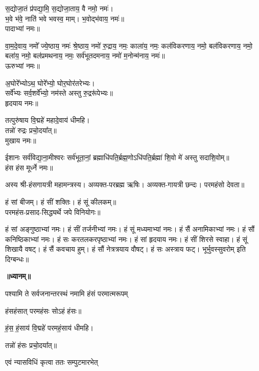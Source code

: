 स॒द्योजा॒तं प्र॑पद्या॒मि॒ स॒द्योजा॒ताय॒ वै नमो॒ नमः॑।\\
भ॒वे भ॑वे॒ नाति॑ भवे भवस्व॒ माम्। भ॒वोद्भ॑वाय॒ नमः॑॥\\
पादाभ्यां नमः॥

वा॒म॒दे॒वाय॒ नमो᳚ ज्ये॒ष्ठाय॒ नमः॑ श्रे॒ष्ठाय॒ नमो॑ रु॒द्राय॒ नमः॒ काला॑य॒ नमः॒ कल॑विकरणाय॒ नमो॒ बल॑विकरणाय॒ नमो॒ बला॑य॒ नमो॒ बल॑प्रमथनाय॒ नमः॒ सर्व॑भूतदमनाय॒ नमो॑ म॒नोन्म॑नाय॒ नमः॑॥\\
ऊरुभ्यां नमः॥ 

अ॒घोरे᳚भ्योऽथ॒ घोरे᳚भ्यो॒ घोर॒घोर॑तरेभ्यः।\\
सर्वे᳚भ्यः सर्व॒शर्वे᳚भ्यो॒ नम॑स्ते अस्तु रु॒द्ररू॑पेभ्यः॥\\
हृदयाय नमः॥ 

तत्पुरु॑षाय वि॒द्महे॑ महादे॒वाय॑ धीमहि।\\
तन्नो॑ रुद्रः प्रचो॒दया᳚त्॥\\
मुखाय नमः॥ 

ईशानः सर्व॑विद्या॒ना॒मीश्वरः सर्व॑भूता॒नां॒ ब्रह्माधि॑पति॒र्ब्रह्म॒णो\-ऽधि॑पति॒र्ब्रह्मा॑ शि॒वो मे॑ अस्तु सदाशि॒वोम्॥\\
हंस हंस मूर्ध्ने नमः॥\\
{\small\closesection}

अस्य श्री-हंसगायत्री महामन्त्रस्य। अव्यक्त-परब्रह्म ऋषिः। अव्यक्त-गायत्री छन्दः। परमहंसो देवता॥ 

हं सां बीजम्। हं सीं शक्तिः। हं सूं कीलकम्॥\\
परमहंस-प्रसाद-सिद्ध्यर्थे जपे विनियोगः॥

हं सां अङ्गुष्ठाभ्यां नमः।
हं सीं तर्जनीभ्यां नमः।
हं सूं मध्यमाभ्यां नमः।
हं सैं अनामिकाभ्यां नमः।
हं सौं कनिष्ठिकाभ्यां नमः।
हं सः करतलकरपृष्ठाभ्यां नमः।
हं सां हृदयाय नमः।
हं सीं शिरसे स्वाहा।
हं सूं शिखायै वषट्।
हं सैं कवचाय हुम्।
हं सौं नेत्रत्रयाय वौषट्।
हं सः अस्त्राय फट्।
भूर्भुवस्सुवरोम् इति दिग्बन्धः॥

\centerline{\textbf{॥ध्यानम्॥}}

{पश्यामि ते सर्वजनान्तरस्थं नमामि हंसं परमात्मरूपम्}
\smallskip
\centerline{हंसहंसात् परमहंसः सोऽहं हंसः॥}
\smallskip
\centerline{हं॒स॒ हं॒साय॑ वि॒द्महे॑ परमहं॒साय॑ धीमहि।}
\centerline{तन्नो॑ हंसः प्रचो॒दया᳚त्॥ } 
\begin{flushright}
\vspace{-5.7ex}{\small (एवं त्रिः)}
\end{flushright}

{एवं न्यासविधिं कृत्वा ततः सम्पुटमारभेत्}

